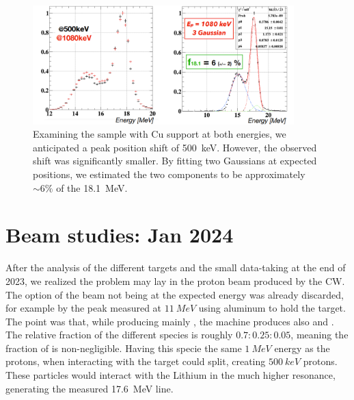 \begin{refsection}
    \begin{figure}
        \centering
        \includegraphics[width = 0.9\textwidth]{Figures/X17/Dec2023/X172023_energy_shift.png}
        \caption[X17: Cu support spectra at 500 and 1080 keV]{Examining the sample with Cu support at both energies, we anticipated a peak position shift of \SI{500}{keV}. However, the observed shift was significantly smaller. By fitting two Gaussians at expected positions, we estimated the two components to be approximately $\sim6\%$ of the \SI{18.1}{MeV}.
}
        \label{fig:X17:2023:Cu:shift}
    \end{figure}

    \section{Beam studies: Jan 2024}
    \label{sec:X17:H2+}
        After the analysis of the different targets and the small data-taking at the end of 2023, we realized the problem may lay in the proton beam produced by the CW.
        The option of the beam not being at the expected energy was already discarded, for example by the peak measured at $\SI{11}{MeV}$ using aluminum to hold the target.
        The point was that, while producing mainly , the machine produces also  and .
        The relative fraction of the different species is roughly $0.7:0.25:0.05$, meaning the fraction of  is non-negligible.
        Having this specie the same $\SI{1}{MeV}$ energy as the protons, when interacting with the target could split, creating  $\SI{500}{keV}$ protons.
        These particles would interact with the Lithium in the much higher resonance, generating the measured \SI{17.6}{MeV} line. 
    

\end{refsection}
